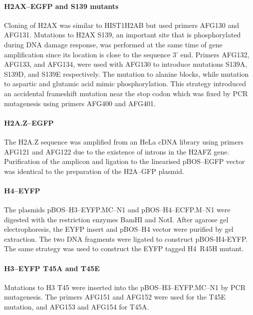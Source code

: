     \paragraph{H2AX--EGFP and S139 mutants}
      Cloning of H2AX was similar to HIST1H2AB but used primers AFG130 and AFG131.
      Mutations to H2AX S139, an important site that is phosphorylated during
      DNA damage response, was performed at the same time of gene amplification
      since its location is close to the sequence 3' end. Primers AFG132, AFG133, and AFG134,
      were used with AFG130 to introduce mutations S139A, S139D, and S139E respectively.
      The mutation to alanine blocks, while mutation to aspartic and glutamic acid
      mimic phosphorylation. This strategy introduced an accidental frameshift mutation
      near the stop codon which was fixed by PCR mutagenesis using primers AFG400
      and AFG401.

    \paragraph{H2A.Z--EGFP}
      The H2A.Z sequence was amplified from an HeLa cDNA library
      using primers AFG121 and AFG122
      due to the existence of introns in the H2AFZ gene.
      Purification of the amplicon and ligation to the linearised pBOS--EGFP vector
      was identical to the preparation of the H2A--GFP plasmid.

    \paragraph{H4--EYFP}
      The plasmids pBOS--H3--EYFP.MC--N1 and pBOS--H4--ECFP.M--N1 were
      digested with the restriction enzymes BamHI and NotI. After agarose
      gel electrophoresis, the EYFP insert and pBOS--H4 vector were purified
      by gel extraction. The two DNA fragments were ligated to construct
      pBOS-H4-EYFP. The same strategy was used to construct the EYFP tagged
      H4~R45H mutant.

    \paragraph{H3--EYFP T45A and T45E}
      Mutations to H3 T45 were inserted into the pBOS--H3--EYFP.MC--N1 by
      PCR mutagenesis. The primers AFG151 and AFG152 were used for the
      T45E mutation, and AFG153 and AFG154 for T45A.


